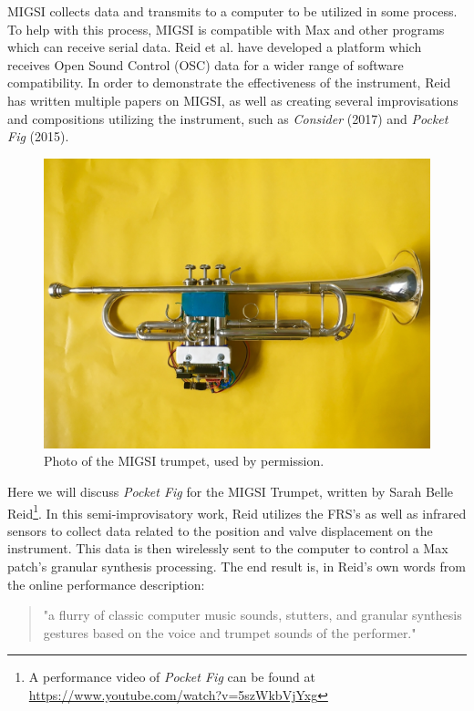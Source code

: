 MIGSI collects data and transmits to a computer to be utilized in some process. To help with this process, MIGSI is compatible with Max and other programs which can receive serial data\cite{reid2016}. Reid et al. have developed a platform which receives Open Sound Control (OSC) data for a wider range of software compatibility\cite{reid_2019}. In order to demonstrate the effectiveness of the instrument, Reid has written multiple papers on MIGSI, as well as creating several improvisations and compositions utilizing the instrument, such as \textit{Consider} (2017) and \textit{Pocket Fig} (2015).

\begin{figure}
    \centering
    \includegraphics[scale=0.25]{diagrams/MIGSI.jpg}
    \caption{Photo of the MIGSI trumpet, used by permission.}
    \label{fig:MIGSI} %
\end{figure}


Here we will discuss \textit{Pocket Fig} for the MIGSI Trumpet, written by Sarah Belle Reid\footnote{A performance video of \textit{Pocket Fig} can be found at \url{https://www.youtube.com/watch?v=5szWkbVjYxg}}. In this semi-improvisatory work, Reid utilizes the FRS's as well as infrared sensors to collect data related to the position and valve displacement on the instrument\cite{reid_2019}. This data is then wirelessly sent to the computer to control a Max patch's granular synthesis processing. The end result is, in Reid's own words from the online performance description: 

\begin{quote}
    "a flurry of classic computer music sounds, stutters, and granular synthesis gestures based on the voice and trumpet sounds of the performer."
\end{quote}

